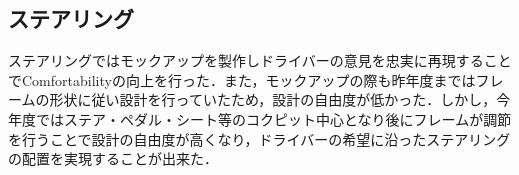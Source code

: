 \subsection{ステアリング}
ステアリングではモックアップを製作しドライバーの意見を忠実に再現することでComfortabilityの向上を行った．また，モックアップの際も昨年度まではフレームの形状に従い設計を行っていたため，設計の自由度が低かった．しかし，今年度ではステア・ペダル・シート等のコクピット中心となり後にフレームが調節を行うことで設計の自由度が高くなり，ドライバーの希望に沿ったステアリングの配置を実現することが出来た．
